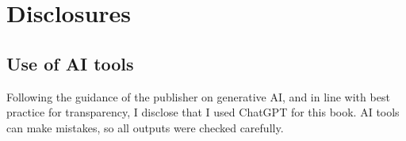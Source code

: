 \chapter*{Disclosures}
\section*{Use of AI tools}
Following the guidance of the publisher on generative AI, and in line with best practice for transparency, I
disclose that I used ChatGPT \citep{openai2024chatgpt} for this book. AI tools can make mistakes, so all
outputs were checked carefully.
